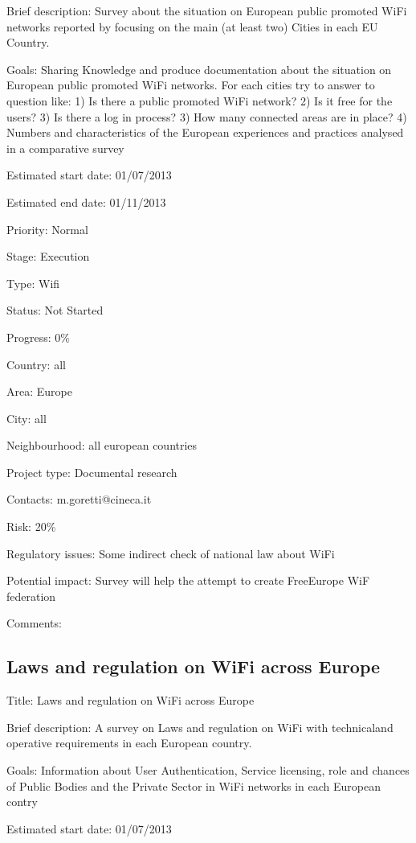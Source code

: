 \documentclass[draftclsnofoot,12pt,journal,onecolumn]{IEEEtran}
\begin{document}
Brief description: Survey  about the situation on European public promoted 
WiFi networks reported by focusing on the main (at least two) Cities in each 
EU Country. 

Goals: Sharing Knowledge and produce documentation about the situation on 
European public promoted WiFi networks.  For each cities try to answer to 
question like: 1) Is there a public promoted WiFi network? 2) Is it free for 
the users? 3) Is there a log in process? 3) How many connected areas are in 
place? 4) Numbers and characteristics of the European experiences and 
practices analysed in a comparative survey 

Estimated start date: 01/07/2013 

Estimated end date: 01/11/2013 

Priority: Normal 

Stage: Execution 

Type: Wifi 

Status: Not Started 

Progress: 0\% 

Country: all 

Area: Europe 

City: all 

Neighbourhood: all european countries 

Project type: Documental research 

Contacts: m.goretti@cineca.it

Risk: 20\% 

Regulatory issues: Some indirect check of national law about WiFi 

Potential impact: Survey will help the attempt to create FreeEurope WiF 
federation 

Comments: 

\subsection{Laws and regulation on WiFi across Europe} 

Title: Laws and regulation on WiFi across Europe 

Brief description:  A survey on Laws and regulation on WiFi with technicaland 
operative requirements in each European country. 

Goals: Information about User Authentication, Service licensing, role and 
chances of Public Bodies and the Private Sector in WiFi networks in each 
European contry 

Estimated start date: 01/07/2013 
\end{document}
